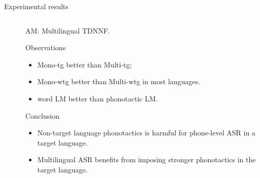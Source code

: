 \documentclass{beamer}
\begin{document}
\begin{frame}{Experimental results}
\begin{columns}
\begin{table}
{\begin{tabular}{l|cc|cc}
\bottomrule
\end{tabular}%
}
\label{tab:PER_results_lm1}
\end{table}
    \begin{footnotesize}
        AM: Multilingual TDNNF.
        \begin{block}{Observations}
            \begin{itemize}
                \item Mono-tg better than Multi-tg; 
                \item Mono-wtg better than Multi-wtg in most languages.
                \item word LM better than phonotactic LM.
            \end{itemize}
        \end{block}
        \begin{block}{Conclusion}
            \begin{itemize}
                \item Non-target language phonotactics is harmful for phone-level ASR in a target language.
                \item Multilingual ASR benefits from imposing stronger phonotactics in the target language. 
            \end{itemize}
            
        \end{block}
    \end{footnotesize}
\end{columns}
    
\end{frame}
\end{document}
